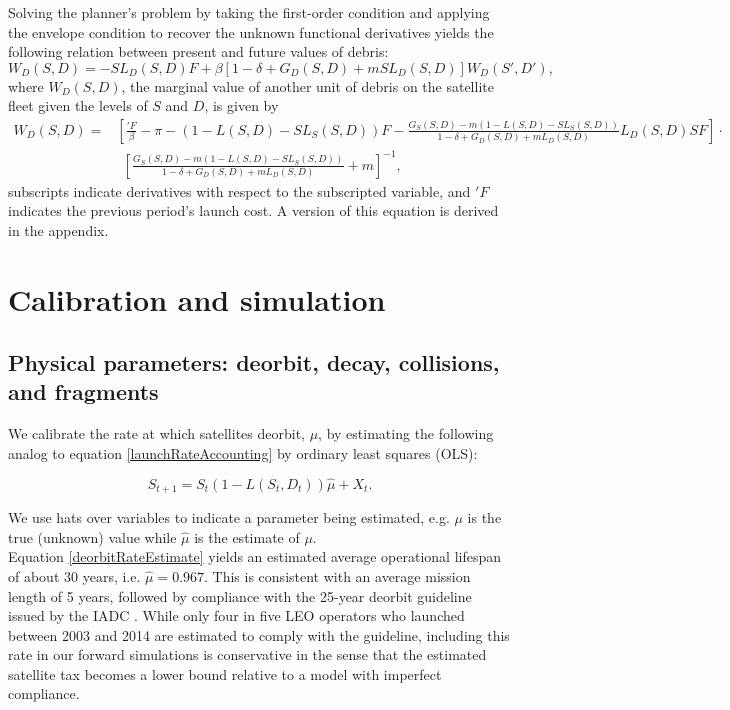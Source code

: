 \documentclass[12pt]{article}
\begin{document}
Solving the planner's problem by taking the first-order condition and applying the envelope condition to recover the unknown functional derivatives yields the following relation between present and future values of debris:
\begin{equation}
\label{plannersFOC}
W_D(S,D) = - S L_D(S,D) F + \beta [1 - \delta + G_D(S,D) + m SL_D(S,D)] W_D(S',D'),
\end{equation}
where $W_D(S,D)$, the marginal value of another unit of debris on the satellite fleet given the levels of $S$ and $D$, is given by
\begin{align}
\label{W_Dformula}
W_D(S,D) =& \left[ \frac{'F}{\beta} - \pi - (1 - L(S,D) - S L_S(S,D))F - \frac{G_S(S,D) - m(1 - L(S,D) - SL_S(S,D))}{1 - \delta + G_D(S,D) + m L_D(S,D)}L_D(S,D) S F  \right] \cdot \nonumber \\
& ~~ \left[ \frac{G_S(S,D) - m(1 - L(S,D) - SL_S(S,D))}{1 - \delta + G_D(S,D) + m L_D(S,D)} + m \right]^{-1},
\end{align}
subscripts indicate derivatives with respect to the subscripted variable, and $'F$ indicates the previous period's launch cost. A version of this equation is derived in the appendix.

\section{Calibration and simulation}

\subsection{Physical parameters: deorbit, decay, collisions, and fragments}

We calibrate the rate at which satellites deorbit, $\mu$, by estimating the following analog to equation \ref{launchRateAccounting} by ordinary least squares (OLS):

\begin{equation}
\label{deorbitRateEstimate}
S_{t+1} = S_t(1-L(S_t,D_t))\hat{\mu} + X_t.
\end{equation}

We use hats over variables to indicate a parameter being estimated, e.g. $\mu$ is the true (unknown) value while $\hat{\mu}$ is the estimate of $\mu$. \\

Equation \ref{deorbitRateEstimate} yields an estimated average operational lifespan of about 30 years, i.e. $\hat{\mu} = 0.967$. This is consistent with an average mission length of 5 years, followed by compliance with the 25-year deorbit guideline issued by the IADC \citep{IADCdmg}. While only four in five LEO operators who launched between 2003 and 2014 are estimated to comply with the guideline, including this rate in our forward simulations is conservative in the sense that the estimated satellite tax becomes a lower bound relative to a model with imperfect compliance. \\
\end{document}

